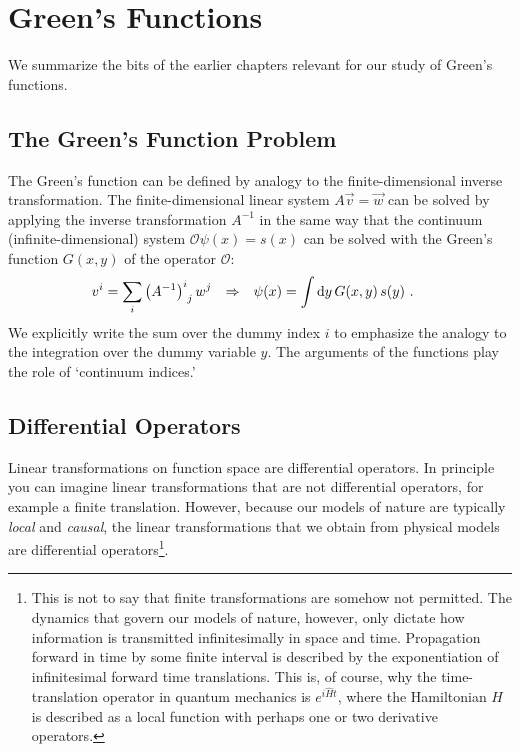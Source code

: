 
\chapter{Green's Functions}
\label{ch:P231:summary}

We summarize the bits of the earlier chapters relevant for our study of Green's functions. 

\section{The Green's Function Problem}

The Green's function can be defined by analogy to the finite-dimensional inverse transformation. The finite-dimensional linear system $A\vec v = \vec w$ can be solved by applying the inverse transformation $A^{-1}$ in the same way that the continuum (infinite-dimensional) system $\mathcal O \psi(x) = s(x)$ can be solved with the Green's function $G(x,y)$ of the operator $\mathcal O$:
\begin{align}
  v^i &= \sum_i 
  \mat{\left(A^{-1}\right)}{i}{j} w^j
  &\Rightarrow
  &
  &
  \psi(x) &= \int  \D{y}\, G(x,y)\, s(y) \ .
  \label{eq:def:of:function:space:Greens:function}
\end{align}
We explicitly write the sum over the dummy index $i$ to emphasize the analogy to the integration over the dummy variable $y$. The arguments of the functions play the role of `continuum indices.'

\section{Differential Operators}

Linear transformations on function space are differential operators. In principle you can imagine linear transformations that are not differential operators, for example a finite translation. However, because our models of nature are typically \emph{local} and \emph{causal}, the linear transformations that we obtain from physical models are differential operators\footnote{This is not to say that finite transformations are somehow not permitted. The dynamics that govern our models of nature, however, only dictate how information is transmitted infinitesimally in space and time. Propagation forward in time by some finite interval is described by the exponentiation of infinitesimal forward time translations. This is, of course, why the time-translation operator in quantum mechanics is $e^{i\hat H t}$, where the Hamiltonian $H$ is described as a local function with perhaps one or two derivative operators.}. 

